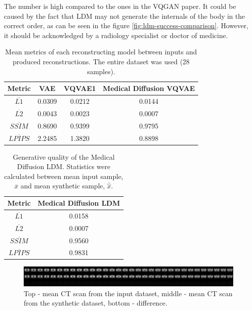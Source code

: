 The number is high compared to the ones in the VQGAN paper\cite{esser2021tamingtransformershighresolutionimage}. It could be caused by the fact that LDM may not generate the internals of the body in the correct order, as can be seen in the figure \ref{fig:ldm-success-comparison}. However, it should be acknowledged by a radiology specialist or doctor of medicine.
\begin{table}[h!]
\centering
\begin{tabular}{|c|c|c|c|}
\hline
\textbf{Metric} & VAE & VQVAE1 & Medical Diffusion VQVAE \\
\hline
$\overline{L1}$ & 0.0309 & 0.0212 & 0.0144 \\
\hline
$\overline{L2}$ & 0.0043 & 0.0023 & 0.0007 \\
\hline
$\overline{SSIM}$ & 0.8690 & 0.9399 & 0.9795 \\
\hline
$\overline{LPIPS}$ & 2.2485 & 1.3820 & 0.8898 \\
\hline
\end{tabular}
\caption{Mean metrics of each reconstructing model between inputs and produced reconstructions. The entire dataset was used (28 samples).}
\label{table:metrics}
\end{table}

\begin{table}[h!]
\centering
\begin{tabular}{|c|c|}
\hline
\textbf{Metric} & Medical Diffusion LDM \\
\hline
$\overline{L1}$ & 0.0158 \\
\hline
$\overline{L2}$ & 0.0007 \\
\hline
$\overline{SSIM}$ & 0.9560 \\
\hline
$\overline{LPIPS}$ & 0.9831 \\
\hline
\end{tabular}
\caption{Generative quality of the Medical Diffusion LDM. Statistics were calculated between mean input sample, $\overline{x}$ and mean synthetic sample,   $\overline{\hat{x}}$.}
\label{table:metrics-ldm}
\end{table}


\begin{figure}[H]
    \centering
    \includegraphics[width=\linewidth]{reports/mean_true_vs_synthetic_comparison.png}
    \caption{Top - mean CT scan from the input dataset, middle - mean CT scan from the synthetic dataset, bottom - difference.}
    \label{fig:mean_true_synth_diff}
\end{figure}


% 